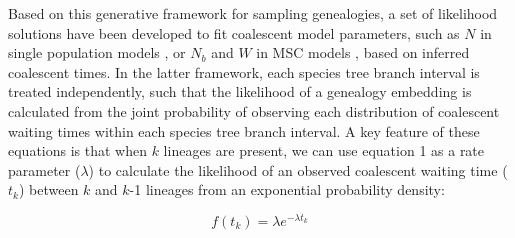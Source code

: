 \documentclass[11pt]{article}
\begin{document}
Based on this generative framework for sampling genealogies, a set of likelihood
solutions have been developed to fit coalescent model parameters, such as 
$N$ in single population models \citep{kingman1982coalescent},
or $N_b$ and $W$ in MSC 
models \citep{rannala2003bayes}, based on inferred coalescent times. 
In the latter framework, each species tree branch interval is treated independently, 
such that the likelihood of a genealogy embedding is calculated from the joint
probability of observing each distribution of coalescent waiting times within
each species tree branch interval. A key feature of these equations is that 
when $k$ lineages are present, we can use equation 1 as a rate parameter ($\lambda$)
to calculate the likelihood of an observed coalescent waiting time ($t_k$) between
$k$ and $k$-1 lineages from an exponential probability density:
	
\begin{equation}
	f(t_k) = \lambda e^{-\lambda t_k} 	
\end{equation}





\end{document}
